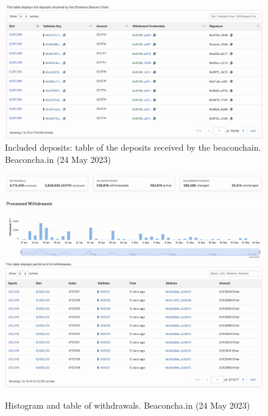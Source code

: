 \documentclass[UTF8]{article}
\begin{document}
\begin{figure}[htbp]
\begin{center}
\includegraphics[width=0.9\linewidth]{images/bincldep}
\caption{Included deposits: table of the deposits received by the beaconchain. Beaconcha.in (24 May 2023)}
\label{fig:bincldep}
\end{center}
\end{figure}

\begin{figure}[htbp]
\begin{center}
\includegraphics[width=0.9\linewidth]{images/bwithdrawals}\\
\includegraphics[width=0.9\linewidth]{images/bwithdrawalstbl}
\caption{Histogram and table of withdrawals. Beaconcha.in (24 May 2023)}
\label{fig:bwithdrawals}
\end{center}
\end{figure}
\end{document}
